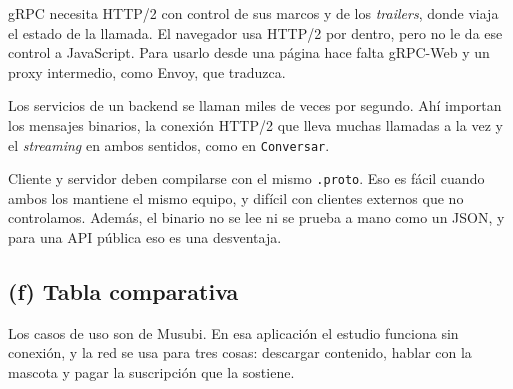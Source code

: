 \documentclass[11pt]{article}
\begin{document}
\begin{description}
  \raggedright
  \item[El navegador no puede hablarlo.] gRPC necesita HTTP/2 con control de sus marcos y de los \emph{trailers}, donde viaja el estado de la llamada. El navegador usa HTTP/2 por dentro, pero no le da ese control a JavaScript. Para usarlo desde una página hace falta gRPC-Web y un proxy intermedio, como Envoy, que traduzca.
  \item[Entre servicios es donde más rinde.] Los servicios de un backend se llaman miles de veces por segundo. Ahí importan los mensajes binarios, la conexión HTTP/2 que lleva muchas llamadas a la vez y el \emph{streaming} en ambos sentidos, como en \texttt{Conversar}.
  \item[El contrato se comparte.] Cliente y servidor deben compilarse con el mismo \texttt{.proto}. Eso es fácil cuando ambos los mantiene el mismo equipo, y difícil con clientes externos que no controlamos. Además, el binario no se lee ni se prueba a mano como un JSON, y para una API pública eso es una desventaja.
\end{description}

\subsection*{(f) Tabla comparativa}

Los casos de uso son de Musubi. En esa aplicación el estudio funciona sin conexión, y la red se usa para tres cosas: descargar contenido, hablar con la mascota y pagar la suscripción que la sostiene.
\end{document}
